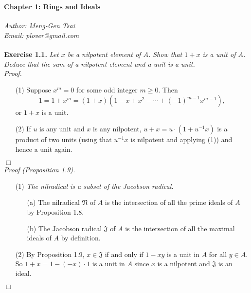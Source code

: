\documentclass{article}
\begin{document}
\textbf{\Large Chapter 1: Rings and Ideals} \\\\



\emph{Author: Meng-Gen Tsai} \\
\emph{Email: plover@gmail.com} \\\\






\textbf{Exercise 1.1.}
\emph{Let $x$ be a nilpotent element of $A$.
Show that $1+x$ is a unit of $A$.
Deduce that the sum of a nilpotent element and a unit is a unit.} \\

\emph{Proof.}
\begin{enumerate}
\item[(1)]
Suppose $x^m = 0$ for some odd integer $m \geq 0$.
Then
$$1 = 1+x^m = (1+x)(1-x+x^2-\cdots+(-1)^{m-1}x^{m-1}),$$
or $1+x$ is a unit.
\item[(2)]
If $u$ is any unit and $x$ is any nilpotent,
$u + x= u \cdot (1 + u^{-1}x)$ is a product of two units
(using that $u^{-1}x$ is nilpotent and applying (1))
and hence a unit again.
\end{enumerate}
$\Box$ \\

\emph{Proof (Proposition 1.9).}
\begin{enumerate}
\item[(1)]
\emph{The nilradical is a subset of the Jacobson radical.}
\begin{enumerate}
\item[(a)]
The nilradical $\mathfrak{N}$ of $A$ is the intersection of all the prime ideals of $A$
by Proposition 1.8.
\item[(b)]
The Jacobson radical $\mathfrak{J}$ of $A$ is the intersection of all the maximal ideals of $A$
by definition.
\end{enumerate}
\item[(2)]
By Proposition 1.9,
$x \in \mathfrak{J}$ if and only if
$1-xy$ is a unit in $A$ for all $y \in A$.
So $1+x = 1 - (-x) \cdot 1$ is a unit in $A$
since $x$ is a nilpotent and $\mathfrak{J}$ is an ideal.
\end{enumerate}
$\Box$ \\\\
\end{document}
